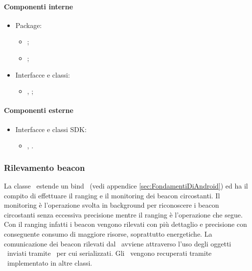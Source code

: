 \documentclass[../Funzionalita.tex]{subfiles}
\begin{document}
			\paragraph*{Componenti interne}
			\begin{itemize}
			
				\item Package:
				\begin{itemize}
					\item[] \view;
					\item[] \presenter;
				\end{itemize}
				
				\item Interfacce e classi:
				\begin{itemize}
					\item[] \HomeActivity, \HomeView;
				\end{itemize}
				
			\end{itemize}
			
			
			\paragraph*{Componenti esterne}
			
			\begin{itemize}
				\item Interfacce e classi SDK:
				\begin{itemize}
					\item[] \Activity, \InformationManager.
				\end{itemize}
			\end{itemize}
			
			
		\subsubsection{Rilevamento beacon}
			La classe \BeaconManagerAdapter\ estende un bind \Service\ (vedi appendice \ref{sec:FondamentiDiAndroid}) ed ha il compito di effettuare il \gls{ranging} e il \gls{monitoring} dei \gls{beacon} circostanti. Il \gls{monitoring} è l'operazione svolta in background per riconoscere i \gls{beacon} 
circostanti senza eccessiva precisione mentre il \gls{ranging} è l'operazione che segue. Con il \gls{ranging} infatti i beacon vengono rilevati con più dettaglio e precisione con conseguente consumo di maggiore risorse, soprattutto energetiche.
			La comunicazione dei \gls{beacon} rilevati dal \model\ avviene attraverso l'uso degli oggetti \MyBeacon\ inviati tramite \Intent\ per cui serializzati. Gli \Intent\ vengono recuperati tramite \BroadcastReceiver\ implementato in altre classi.
			
\end{document}
